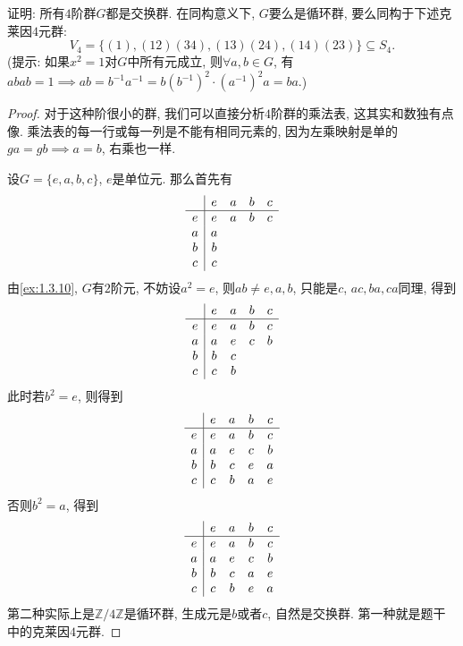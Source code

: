 \begin{problem}\label{ex:4.2.7}
    证明: 所有$4$阶群$G$都是交换群. 在同构意义下, $G$要么是循环群, 要么同构于下述克莱因$4$元群: 
    \[
        V_4 = \{(1), (12)(34), (13)(24), (14)(23)\} \subseteq S_4.
    \]
    (提示: 如果$x^2 = 1$对$G$中所有元成立, 则$\forall a, b \in G$, 有$abab = 1 \implies ab = b^{-1}a^{-1} = b(b^{-1})^2 \cdot (a^{-1})^2a = ba.$)
\end{problem}

\begin{proof}
    对于这种阶很小的群, 我们可以直接分析$4$阶群的乘法表, 这其实和数独有点像. 乘法表的每一行或每一列是不能有相同元素的, 因为左乘映射是单的$ga = gb \implies a = b$, 右乘也一样.

    设$G = \{e, a, b, c\}$, $e$是单位元. 那么首先有
    \[
    \begin{array}{c|c c c c}
      & e & a & b & c \\
    \hline
    e & e & a & b & c \\
    a & a &  &  &  \\
    b & b &  &  &  \\
    c & c &  &  &  \\
    \end{array}
    \]
    由\ref{ex:1.3.10}, $G$有$2$阶元, 不妨设$a^2 = e$, 则$ab \neq e, a, b$, 只能是$c$, $ac, ba, ca$同理, 得到
    \[
    \begin{array}{c|c c c c}
      & e & a & b & c \\
    \hline
    e & e & a & b & c \\
    a & a & e & c & b \\
    b & b & c &  &  \\
    c & c & b &  &  \\
    \end{array}
    \]
    此时若$b^2 = e$, 则得到
    \[
    \begin{array}{c|c c c c}
      & e & a & b & c \\
    \hline
    e & e & a & b & c \\
    a & a & e & c & b \\
    b & b & c & e & a \\
    c & c & b & a & e\\
    \end{array}
    \]
    否则$b^2 = a$, 得到
    \[
    \begin{array}{c|c c c c}
      & e & a & b & c \\
    \hline
    e & e & a & b & c \\
    a & a & e & c & b \\
    b & b & c & a & e \\
    c & c & b & e & a\\
    \end{array}
    \]
    第二种实际上是$\mathbb{Z}/4\mathbb{Z}$是循环群, 生成元是$b$或者$c$, 自然是交换群. 第一种就是题干中的克莱因$4$元群.
\end{proof}

